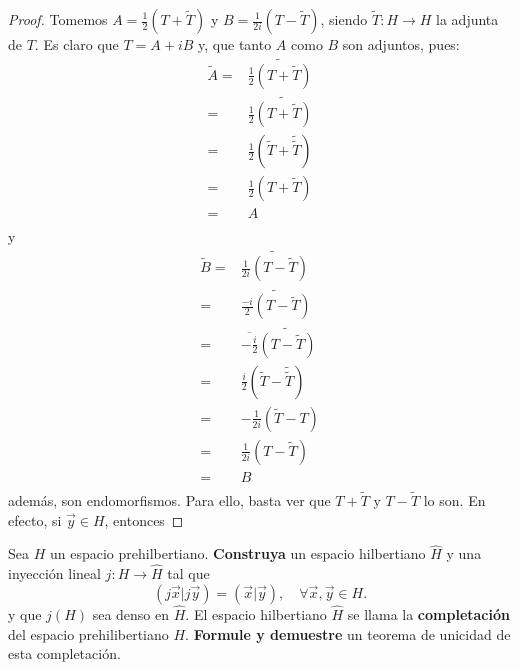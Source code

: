 \documentclass[12pt]{report}
\theoremstyle{largebreak}
\newcommand\cf[3]{\ensuremath{#1:#2\rightarrow#3}}
\newcommand\adj[1]{\ensuremath{\widetilde{#1}}}
\newcommand\pint[2]{\ensuremath{\left(#1\big|#2\right)}}
\newcommand\conj[1]{\ensuremath{\overline{#1}}}
\begin{document}
    \begin{proof}
        Tomemos $A=\frac{1}{2}(T+\adj{T})$ y $B=\frac{1}{2i}(T-\adj{T})$, siendo $\cf{\adj{T}}{H}{H}$ la adjunta de $T$. Es claro que $T=A+iB$ y, que tanto $A$ como $B$ son adjuntos, pues:
        \begin{equation*}
            \begin{split}
                \adj{A}=&\adj{\frac{1}{2}(T+\adj{T})} \\
                =&\frac{1}{2}\adj{(T+\adj{T})} \\
                =&\frac{1}{2}(\adj{T}+\adj{\adj{T}}) \\
                =&\frac{1}{2}(T+\adj{T}) \\
                =&A\\
            \end{split}
        \end{equation*}
        y
        \begin{equation*}
            \begin{split}
                \adj{B}=&\adj{\frac{1}{2i}(T-\adj{T})} \\
                =&\adj{\frac{-i}{2}(T-\adj{T})} \\
                =&\conj{-\frac{i}{2}}\adj{(T-\adj{T})} \\
                =&\frac{i}{2}(\adj{T}-\adj{\adj{T}}) \\
                =&-\frac{1}{2i}(\adj{T}-T) \\
                =&\frac{1}{2i}(T-\adj{T}) \\
                =&B \\
            \end{split}
        \end{equation*}
        además, son endomorfismos. Para ello, basta ver que $T+\adj{T}$ y $T-\adj{T}$ lo son. En efecto, si $\vec{y}\in H$, entonces 
    \end{proof}

    \begin{excer}
        Sea $H$ un espacio prehilbertiano. \textbf{Construya} un espacio hilbertiano $\hat{H}$ y una inyección lineal $\cf{j}{H}{\hat{H}}$ tal que
        \begin{equation*}
            \pint{j\vec{x}}{j\vec{y}}=\pint{\vec{x}}{\vec{y}},\quad\forall\vec{x},\vec{y}\in H.
        \end{equation*}
        y que $j(H)$ sea denso en $\hat{H}$. El espacio hilbertiano $\hat{H}$ se llama la \textbf{completación} del espacio prehilibertiano $H$. \textbf{Formule y demuestre} un teorema de unicidad de esta completación.
    \end{excer}
\end{document}
